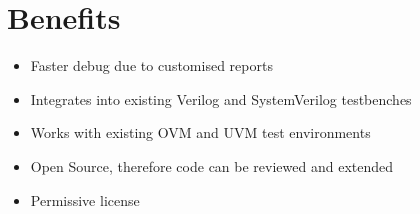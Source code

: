 \section{Benefits}\label{Benefits}

\begin{itemize}
\item
  Faster debug due to customised reports
\item
  Integrates into existing Verilog and SystemVerilog testbenches
\item
  Works with existing OVM and UVM test environments
\item
  Open Source, therefore code can be reviewed and extended
\item
  Permissive license
\end{itemize}